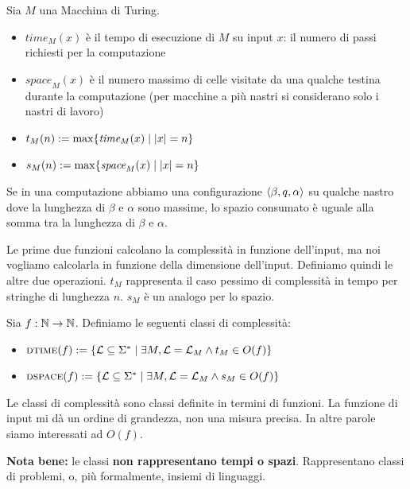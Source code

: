 \begin{defn}
    Sia $M$ una Macchina di Turing.
    \begin{itemize}
        \item $\textit{time}_{M}(x)$ è il tempo di esecuzione di $M$ su input $x$: il numero di
        passi richiesti per la computazione
        \item $\textit{space}_{M}(x)$ è il numero massimo di celle visitate da una qualche testina
        durante la computazione (per macchine a più nastri si considerano solo i nastri di lavoro)
        \item $t_{M}(n) := \max\{\textit{time}_{M}(x) \mid |x| = n\}$
        \item $s_{M}(n) := \max\{\textit{space}_{M}(x) \mid |x| = n\}$
    \end{itemize}
\end{defn}

Se in una computazione abbiamo una configurazione $\langle \beta, q, \alpha \rangle$ su qualche nastro dove
la lunghezza di $\beta$ e $\alpha$ sono massime, lo spazio consumato è uguale alla somma tra la
lunghezza di $\beta$ e $\alpha$.

Le prime due funzioni calcolano la complessità in funzione dell'input, ma noi vogliamo calcolarla
in funzione della dimensione dell'input. Definiamo quindi le altre due operazioni. $t_{M}$
rappresenta il caso pessimo di complessità in tempo per stringhe di lunghezza $n$. $s_{M}$ è un
analogo per lo spazio.

\begin{defn}
    Sia $f:\mathbb{N} \to \mathbb{N}$. Definiamo le seguenti classi di complessità:
    \begin{itemize}
        \item $\textsc{dtime}(f) := \{\mathcal{L} \subseteq \Sigma^{*} \mid \exists M, \mathcal{L} = \mathcal{L}_{M} \land
        t_{M} \in O(f)\}$
        \item $\textsc{dspace}(f) := \{\mathcal{L} \subseteq \Sigma^{*} \mid \exists M, \mathcal{L} = \mathcal{L}_{M} \land
        s_{M} \in O(f)\}$
    \end{itemize}
\end{defn}

Le classi di complessità sono classi definite in termini di funzioni. La funzione di input mi dà
un ordine di grandezza, non una misura precisa. In altre parole siamo interessati ad $O(f)$.

\textbf{Nota bene:} le classi \textbf{non rappresentano tempi o spazi}. Rappresentano classi di
problemi, o, più formalmente, insiemi di linguaggi.

